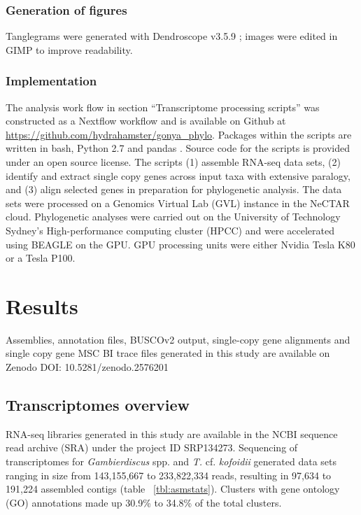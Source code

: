 \documentclass[fleqn,10pt,lineno]{wlpeerj} %
\begin{document}
\subsubsection*{Generation of figures}
Tanglegrams were generated with Dendroscope v3.5.9 \cite{huson2007dendroscope}; images were edited in GIMP \cite{gimp2008image} to improve readability.

\subsubsection*{Implementation}
The analysis work flow in section ``Transcriptome processing scripts'' was constructed as a Nextflow workflow \cite{di2017nextflow} and is available on Github at \url{https://github.com/hydrahamster/gonya\_phylo}. 
Packages within the scripts are written in bash, Python 2.7 \cite{stevens2018python} and pandas \cite{pandas}. 
Source code for the scripts is provided under an open source license.
The scripts (1) assemble RNA-seq data sets, (2) identify and extract single copy genes across input taxa with extensive paralogy, and (3) align selected genes in preparation for phylogenetic analysis.
The data sets were processed on a Genomics Virtual Lab (GVL) \cite{afgan2015genomics} instance in the NeCTAR cloud.
Phylogenetic analyses were carried out on the University of Technology Sydney's High-performance computing cluster (HPCC) and were accelerated using BEAGLE \cite{ayres2011beagle} on the GPU.
GPU processing units were either Nvidia Tesla K80 or a Tesla P100.

\section*{Results}
Assemblies, annotation files, BUSCOv2 output, single-copy gene alignments and single copy gene MSC BI trace files generated in this study are available on Zenodo DOI: 10.5281/zenodo.2576201

\subsection*{Transcriptomes overview}
RNA-seq libraries generated in this study are available in the NCBI sequence read archive (SRA) under the project ID SRP134273.
Sequencing of transcriptomes for \emph{Gambierdiscus} spp. and \emph{T.} cf. \emph{kofoidii} generated data sets ranging in size from 143,155,667 to 233,822,334 reads, resulting in 97,634 to 191,224 assembled contigs (table ~\ref{tbl:asmstats}). 
Clusters with gene ontology (GO) annotations made up 30.9\% to 34.8\% of the total clusters. 
\end{document}
